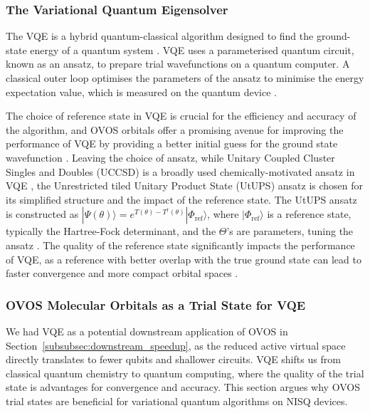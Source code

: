 \subsubsection{The Variational Quantum Eigensolver}

The VQE \cite{Peruzzo2014} is a hybrid quantum-classical algorithm designed to find the ground-state energy of a quantum system \cite{Cao2019}. VQE uses a parameterised quantum circuit, known as an ansatz, to prepare trial wavefunctions on a quantum computer. A classical outer loop optimises the parameters of the ansatz to minimise the energy expectation value, which is measured on the quantum device \cite{Peruzzo2014, Cao2019}.

The choice of reference state in VQE is crucial for the efficiency and accuracy of the algorithm, and OVOS orbitals offer a promising avenue for improving the performance of VQE by providing a better initial guess for the ground state wavefunction \cite{Cao2019}. Leaving the choice of ansatz, while Unitary Coupled Cluster Singles and Doubles (UCCSD) is a broadly used chemically-motivated ansatz in VQE \cite{Peruzzo2014, Cao2019}, the Unrestricted tiled Unitary Product State (UtUPS) ansatz is chosen for its simplified structure and the impact of the reference state. The UtUPS ansatz is constructed as $|\Psi(\theta)\rangle = e^{T(\theta) - T^\dagger(\theta)} |\Phi_{\text{ref}}\rangle$, where $|\Phi_{\text{ref}}\rangle$ is a reference state, typically the Hartree-Fock determinant, and the $\Theta$'s are parameters, tuning the ansatz \cite{Peruzzo2014}. The quality of the reference state significantly impacts the performance of VQE, as a reference with better overlap with the true ground state can lead to faster convergence and more compact orbital spaces \cite{Cao2019}.


\subsubsection{OVOS Molecular Orbitals as a Trial State for VQE}
\label{sec:ovos_vqe}

We had VQE as a potential downstream application of OVOS in Section~\ref{subsubsec:downstream_speedup}, as the reduced active virtual space directly translates to fewer qubits and shallower circuits. VQE shifts us from classical quantum chemistry to quantum computing, where the quality of the trial state is advantages for convergence and accuracy. This section argues why OVOS trial states are beneficial for variational quantum algorithms on NISQ devices.

